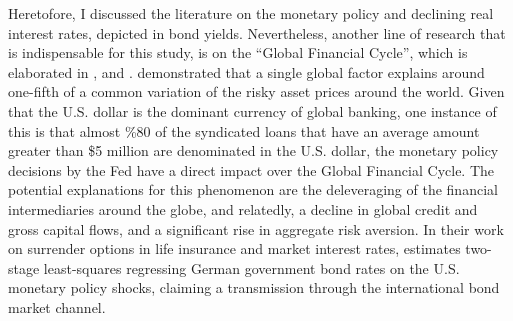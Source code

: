 Heretofore, I discussed the literature on the monetary policy and declining real interest rates, depicted in bond yields. Nevertheless, another line of research that is indispensable for this study, is on the ``Global Financial Cycle'', which is elaborated in \citet{miranda2015world}, \citet{miranda2020us} and \citet{rey2021}. \citet{miranda2020us} demonstrated that a single global factor explains around one-fifth of a common variation of the risky asset prices around the world. Given that the U.S. dollar is the dominant currency of global banking, one instance of this is that almost \%80 of the syndicated loans that have an average amount greater than \$5 million are denominated in the U.S. dollar, the monetary policy decisions by the Fed have a direct impact over the Global Financial Cycle. The potential explanations for this phenomenon are the deleveraging of the financial intermediaries around the globe, and relatedly, a decline in global credit and gross capital flows, and a significant rise in aggregate risk aversion. \citep{miranda2020us} In their work on surrender options in life insurance and market interest rates, \citet{kubitza2023life} estimates two-stage least-squares regressing German government bond rates on the U.S. monetary policy shocks, claiming a transmission through the international bond market channel.
